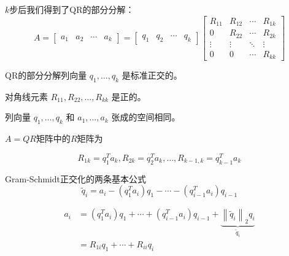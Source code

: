 $k$步后我们得到了QR的部分分解：
$$
A=\left[\begin{array}{llll}
a_{1} & a_{2} & \cdots & a_{k}
\end{array}\right]=\left[\begin{array}{llll}
q_{1} & q_{2} & \cdots & q_{k}
\end{array}\right]\left[\begin{array}{cccc}
R_{11} & R_{12} & \cdots & R_{1 k} \\
0 & R_{22} & \cdots & R_{2 k} \\
\vdots & \vdots & \ddots & \vdots \\
0 & 0 & \cdots & R_{k k}
\end{array}\right]
$$

\begin{corollary}
    QR的部分分解列向量 $q_{1}, \ldots, q_{k}$ 是标准正交的。
\end{corollary}

\begin{corollary}
    对角线元素 $R_{11}, R_{22}, \ldots, R_{k k}$ 是正的。
\end{corollary}

\begin{corollary}
    列向量 $q_{1}, \ldots, q_{k}$ 和 $a_{1}, \ldots, a_{k}$ 张成的空间相同。
\end{corollary}

\begin{theorem}
$A = Q R$矩阵中的$R$矩阵为

    $$R_{1 k}=q_{1}^{T} a_{k},  R_{2 k}=q_{2}^{T} a_{k}, \ldots,  R_{k-1, k}=q_{k-1}^{T} a_{k}$$
\end{theorem}

\begin{remark}
    Gram-Schmidt正交化的两条基本公式
    $$ \widetilde{q}_{i}=a_{i}-\left(q_{1}^{T} a_{i}\right) q_{1}-\cdots-\left(q_{i-1}^{T} a_{i}\right) q_{i-1} $$

    $$ \begin{aligned}
        a_{i}&=\left(q_{1}^{T} a_{i}\right) q_{1}+\cdots+\left(q_{i-1}^{T} a_{i}\right) q_{i-1} +\underbrace{
\left\|\tilde{q}_{i}\right\|_{2} q_{i}}_{\widetilde{q}_{i}}
        \\ &=R_{1 i} q_{1}+\cdots+R_{i i} q_{i}
    \end{aligned}
      $$
\end{remark}

